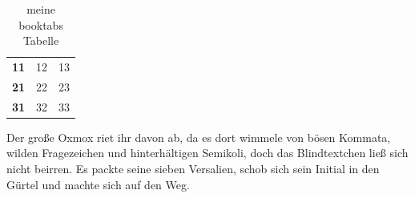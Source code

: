 \documentclass[%
	12pt,%
	a4paper,%
	oneside,%
 liststotoc, idxtotoc, bibtotoc, %
	halfparskip,%
	nochapterprefix,%
	appendixprefix, %
smallheadings,%
]{scrreprt}
\newcommand{\thead}[1]{\textbf{#1}}
\begin{document}
\begin{table}[htbp]
	\centering
		\begin{tabular}{l l l}
			\thead{11} & 12 & 13 \\ %
			\thead{21} & 22 & 23 \\
			\thead{31} & 32 & 33
		\end{tabular}
	\caption{meine booktabs Tabelle}
	\label{tab:meinebooktabsTabelle}
\end{table}


Der große Oxmox riet ihr davon ab, da es dort wimmele von bösen Kommata, wilden Fragezeichen und hinterhältigen Semikoli, doch das Blindtextchen ließ sich nicht beirren. Es packte seine sieben Versalien, schob sich sein Initial in den Gürtel und machte sich auf den Weg. 


\end{document}
